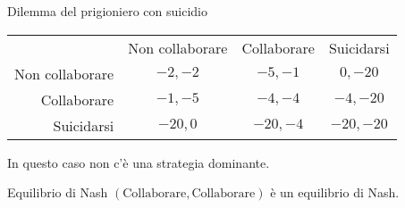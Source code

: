 \documentclass{beamer}
\theoremstyle{plain}
\theoremstyle{definition}
\theoremstyle{remark}
\newcommand{\pa}[1]{\left(#1\right)}
\begin{document}
\begin{frame}{Dilemma del prigioniero con suicidio}
    \begin{tabular}{rccc}
    & Non collaborare & Collaborare & Suicidarsi \\
    \cline{2-4}
    Non collaborare & \multicolumn{1}{|c|}{$-2,-2$} & \multicolumn{1}{|c|}{$-5,-1$} & \multicolumn{1}{|c|}{$0,-20$}  \\
    \cline{2-4}
    Collaborare & \multicolumn{1}{|c|}{$-1,-5$} & \multicolumn{1}{|c|}{$-4,-4$}  & \multicolumn{1}{|c|}{$-4,-20$} \\
    \cline{2-4}
    Suicidarsi & \multicolumn{1}{|c|}{$-20,0$} & \multicolumn{1}{|c|}{$-20,-4$}  & \multicolumn{1}{|c|}{$-20,-20$} \\
    \cline{2-4}
  \end{tabular}
  \vfill
  
  In questo caso non c'è una strategia dominante.

  \begin{block}{Equilibrio di Nash}
    $\pa{\text{Collaborare},\text{Collaborare}}$ è un equilibrio di Nash.
  \end{block}
\end{frame}
\end{document}
